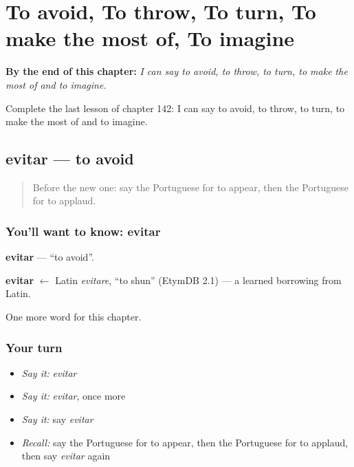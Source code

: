 
\chapter{To avoid, To throw, To turn, To make the most of, To imagine}
\label{ch:pt-to-avoid-to-throw-to-turn-to-make-the-most-of-to-imagine}

\begin{chapteropening}
\textbf{By the end of this chapter:} \emph{I can say to avoid, to throw, to turn, to make the most of and to imagine.}

Complete the last lesson of chapter 142: I can say to avoid, to throw, to turn, to make the most of and to imagine.
\end{chapteropening}

\section[evitar]{evitar — to avoid}

\label{lesson:PT-C142-evitar}



\begin{quote}
Before the new one: say the Portuguese for to appear, then the Portuguese for to applaud.
\end{quote}

\subsection*{You'll want to know: evitar}
\textbf{evitar} — \textquotedblleft{}to avoid\textquotedblright{}.

\begin{cousinweb}
\textbf{evitar} $\leftarrow$ Latin \emph{evitare}, \textquotedblleft{}to shun\textquotedblright{} (EtymDB 2.1) — a learned borrowing from Latin.
\end{cousinweb}

\begin{grammarlens}[title={What you've built}]
One more word for this chapter.
\end{grammarlens}

\subsection*{Your turn}
\begin{itemize}
\raggedright
  \item \emph{Say it:} \emph{evitar}
  \item \emph{Say it:} \emph{evitar}, once more
  \item \emph{Say it:} say \emph{evitar}
  \item \emph{Recall:} say the Portuguese for to appear, then the Portuguese for to applaud, then say \emph{evitar} again
\end{itemize}

